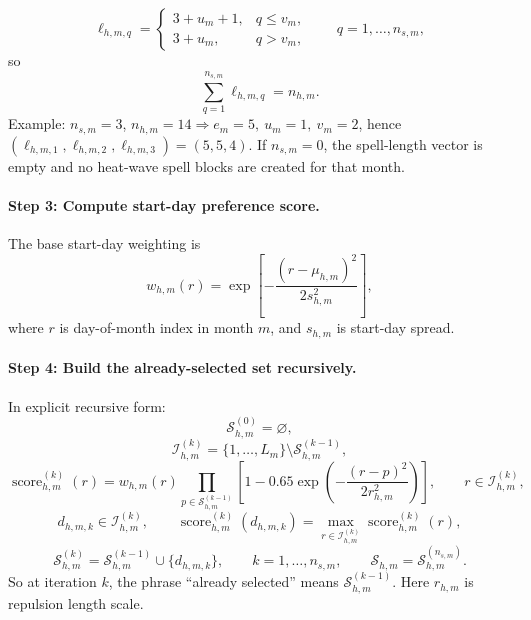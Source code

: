\documentclass[11pt]{article}
\begin{document}
\begin{equation}
\label{eq:heatwave_lengths_closed}
\ell_{h,m,q}=
\begin{cases}
3+u_m+1, & q\le v_m,\\
3+u_m, & q>v_m,
\end{cases}
\qquad q=1,\dots,n_{s,m},
\end{equation}
so
\[
\sum_{q=1}^{n_{s,m}}\ell_{h,m,q}=n_{h,m}.
\]
Example: \(n_{s,m}=3\), \(n_{h,m}=14\Rightarrow e_m=5,\ u_m=1,\ v_m=2\), hence \((\ell_{h,m,1},\ell_{h,m,2},\ell_{h,m,3})=(5,5,4)\).
If \(n_{s,m}=0\), the spell-length vector is empty and no heat-wave spell blocks are created for that month.

\paragraph{Step 3: Compute start-day preference score.}
The base start-day weighting is
\begin{equation}
\label{eq:heatwave_weight}
w_{h,m}(r)=\exp\!\left[-\frac{(r-\mu_{h,m})^2}{2s_{h,m}^2}\right],
\end{equation}
where \(r\) is day-of-month index in month \(m\), and \(s_{h,m}\) is start-day spread.

\paragraph{Step 4: Build the already-selected set recursively.}
In explicit recursive form:
\begin{equation}
\label{eq:heatwave_start_set_init}
\mathcal{S}_{h,m}^{(0)}=\varnothing,
\end{equation}
\begin{equation}
\label{eq:heatwave_start_set_candidates}
\mathcal{I}_{h,m}^{(k)}=\{1,\dots,L_m\}\setminus\mathcal{S}_{h,m}^{(k-1)},
\end{equation}
\begin{equation}
\label{eq:heatwave_repulsion}
\operatorname{score}_{h,m}^{(k)}(r)=
w_{h,m}(r)\prod_{p\in\mathcal{S}_{h,m}^{(k-1)}}
\left[1-0.65\exp\!\left(-\frac{(r-p)^2}{2r_{h,m}^2}\right)\right],
\qquad r\in\mathcal{I}_{h,m}^{(k)},
\end{equation}
\begin{equation}
\label{eq:heatwave_start_set_choice}
d_{h,m,k}\in\mathcal{I}_{h,m}^{(k)},
\qquad
\operatorname{score}_{h,m}^{(k)}(d_{h,m,k})=
\max_{r\in\mathcal{I}_{h,m}^{(k)}}\operatorname{score}_{h,m}^{(k)}(r),
\end{equation}
\begin{equation}
\label{eq:heatwave_start_set_update}
\mathcal{S}_{h,m}^{(k)}=\mathcal{S}_{h,m}^{(k-1)}\cup\{d_{h,m,k}\},
\qquad
k=1,\dots,n_{s,m},
\qquad
\mathcal{S}_{h,m}=\mathcal{S}_{h,m}^{(n_{s,m})}.
\end{equation}
So at iteration \(k\), the phrase ``already selected'' means \(\mathcal{S}_{h,m}^{(k-1)}\). Here \(r_{h,m}\) is repulsion length scale.
\end{document}
